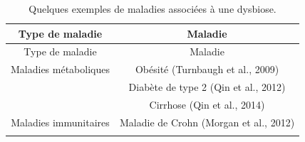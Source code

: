 \documentclass[12pt,a4paper]{reedthesis}
\theoremstyle{definition}
\theoremstyle{definition}
\theoremstyle{definition}
\theoremstyle{remark}
\begin{document}
\newpage
\begin{longtable}[]{@{}cc@{}}
\caption{\label{tab:dysbioses} Quelques exemples de maladies associées à une dysbiose.}\tabularnewline
\toprule
\begin{minipage}[b]{0.31\columnwidth}\centering
Type de maladie\strut
\end{minipage} & \begin{minipage}[b]{0.63\columnwidth}\centering
Maladie\strut
\end{minipage}\tabularnewline
\midrule
\endfirsthead
\toprule
\begin{minipage}[b]{0.31\columnwidth}\centering
Type de maladie\strut
\end{minipage} & \begin{minipage}[b]{0.63\columnwidth}\centering
Maladie\strut
\end{minipage}\tabularnewline
\midrule
\endhead
\begin{minipage}[t]{0.31\columnwidth}\centering
Maladies métaboliques\strut
\end{minipage} & \begin{minipage}[t]{0.63\columnwidth}\centering
Obésité (Turnbaugh et al., 2009)\strut
\end{minipage}\tabularnewline
\begin{minipage}[t]{0.31\columnwidth}\centering
\strut
\end{minipage} & \begin{minipage}[t]{0.63\columnwidth}\centering
Diabète de type 2 (Qin et al., 2012)\strut
\end{minipage}\tabularnewline
\begin{minipage}[t]{0.31\columnwidth}\centering
\strut
\end{minipage} & \begin{minipage}[t]{0.63\columnwidth}\centering
Cirrhose (Qin et al., 2014)\strut
\end{minipage}\tabularnewline
\begin{minipage}[t]{0.31\columnwidth}\centering
Maladies immunitaires\strut
\end{minipage} & \begin{minipage}[t]{0.63\columnwidth}\centering
Maladie de Crohn (Morgan et al., 2012)\strut
\end{minipage}\tabularnewline
\begin{minipage}[t]{0.31\columnwidth}\centering
\strut
\end{minipage} & \begin{minipage}[t]{0.63\columnwidth}\centering

\end{minipage}
\end{longtable}
\end{document}
